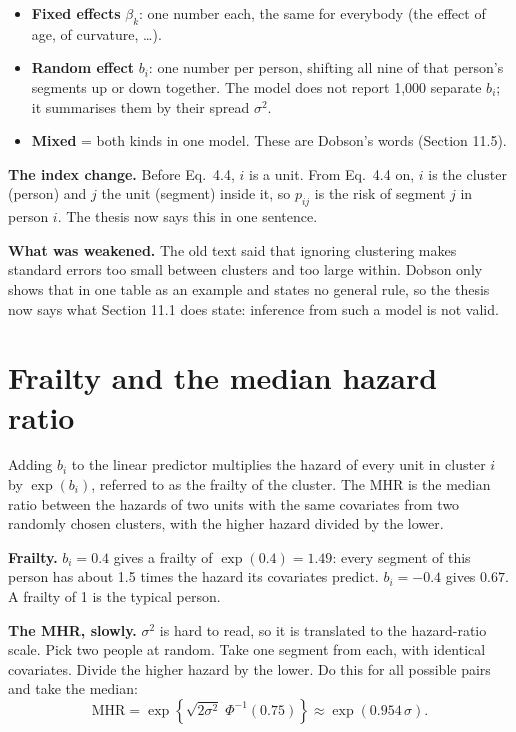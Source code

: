 \documentclass[11pt]{article}
\begin{document}
\begin{itemize}
  \item \textbf{Fixed effects} $\beta_k$: one number each, the same for everybody (the effect of age,
        of curvature, \dots).
  \item \textbf{Random effect} $b_i$: one number per person, shifting all nine of that person's
        segments up or down together. The model does not report 1,000 separate $b_i$; it summarises
        them by their spread $\sigma^2$.
  \item \textbf{Mixed} = both kinds in one model. These are Dobson's words (Section 11.5).
\end{itemize}

\textbf{The index change.} Before Eq.~4.4, $i$ is a unit. From Eq.~4.4 on, $i$ is the cluster
(person) and $j$ the unit (segment) inside it, so $p_{ij}$ is the risk of segment $j$ in person $i$.
The thesis now says this in one sentence.

\textbf{What was weakened.} The old text said that ignoring clustering makes standard errors too
small between clusters and too large within. Dobson only shows that in one table as an example and
states no general rule, so the thesis now says what Section 11.1 does state: inference from such a
model is not valid.

\section{Frailty and the median hazard ratio}

\begin{thesisline}
Adding $b_i$ to the linear predictor multiplies the hazard of every unit in cluster $i$ by
$\exp(b_i)$, referred to as the frailty of the cluster. The MHR is the median ratio between the
hazards of two units with the same covariates from two randomly chosen clusters, with the higher
hazard divided by the lower.
\end{thesisline}

\textbf{Frailty.} $b_i = 0.4$ gives a frailty of $\exp(0.4) = 1.49$: every segment of this person
has about 1.5 times the hazard its covariates predict. $b_i = -0.4$ gives $0.67$. A frailty of 1 is
the typical person.

\textbf{The MHR, slowly.} $\sigma^2$ is hard to read, so it is translated to the hazard-ratio scale.
Pick two people at random. Take one segment from each, with identical covariates. Divide the higher
hazard by the lower. Do this for all possible pairs and take the median:
\[
  \mathrm{MHR} = \exp\!\left\{\sqrt{2\sigma^2}\;\Phi^{-1}(0.75)\right\} \approx \exp(0.954\,\sigma) .
\]
\end{document}
